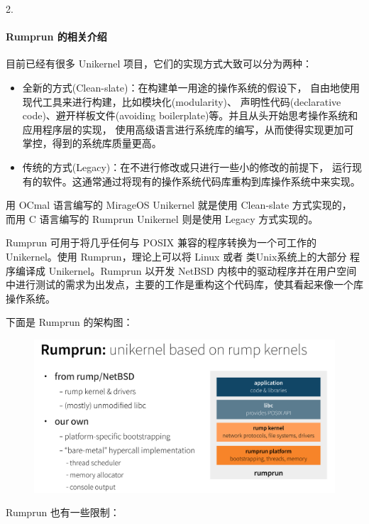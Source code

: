 \documentclass[UTF8,fontset=none,linespread=1.15]{ctexart}
\let\nosupcite\cite
\renewcommand*{\cite}[1]{\textsuperscript{\nosupcite{#1}}}
\begin{document}
2. \paragraph{Rumprun 的相关介绍}\cite{bib:23-mirageos}\cite{bib:24-rumrun}

目前已经有很多 Unikernel 项目，它们的实现方式大致可以分为两种：
\begin{itemize}
\item 全新的方式(Clean-slate)：在构建单一用途的操作系统的假设下，
自由地使用现代工具来进行构建，比如模块化(modularity)、
声明性代码(declarative code)、避开样板文件(avoiding boilerplate)等。并且从头开始思考操作系统和应用程序层的实现，
使用高级语言进行系统库的编写，从而使得实现更加可掌控，得到的系统库质量更高。
\item 传统的方式(Legacy)：在不进行修改或只进行一些小的修改的前提下，
运行现有的软件。这通常通过将现有的操作系统代码库重构到库操作系统中来实现。
\end{itemize}

用 OCmal 语言编写的 MirageOS Unikernel 就是使用 Clean-slate 方式实现的，
而用 C 语言编写的 Rumprun Unikernel 则是使用 Legacy 方式实现的。

Rumprun 可用于将几乎任何与 POSIX 兼容的程序转换为一个可工作的
Unikernel。使用 Rumprun，理论上可以将 Linux 或者 类Unix系统上的大部分
程序编译成 Unikernel。Rumprun 以开发 NetBSD 内核中的驱动程序并在用户空间
中进行测试的需求为出发点，主要的工作是重构这个代码库，使其看起来像一个库操作系统。

下面是 Rumprun 的架构图：
\begin{figure}[H]
\includegraphics[width=\linewidth]{pictures/rumprun-2.png}
\end{figure}

Rumprun 也有一些限制：
\end{document}

